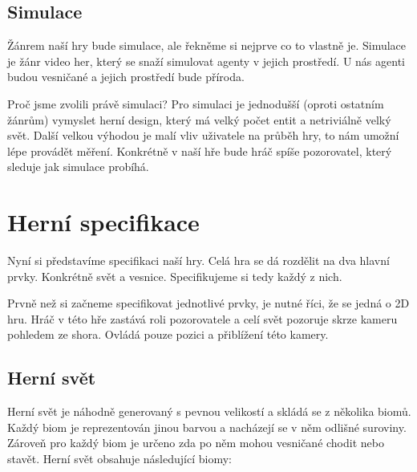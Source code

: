 
\subsection{Simulace}
Žánrem naší hry bude simulace, ale řekněme si nejprve co to vlastně je. Simulace je žánr video her, který se snaží simulovat agenty v jejich prostředí. U nás agenti budou vesničané a jejich prostředí bude příroda.

Proč jsme zvolili právě simulaci? Pro simulaci je jednodušší (oproti ostatním žánrům) vymyslet herní design, který má velký počet entit a netriviálně velký svět. Další velkou výhodou je malí vliv uživatele na průběh hry, to nám umožní lépe provádět měření. Konkrétně v naší hře bude hráč spíše pozorovatel, který sleduje jak simulace probíhá.


\section{Herní specifikace}
\label{sec:game-spec}
Nyní si představíme specifikaci naší hry. Celá hra se dá rozdělit na dva hlavní prvky. Konkrétně svět a vesnice. Specifikujeme si tedy každý z nich.

Prvně než si začneme specifikovat jednotlivé prvky, je nutné říci, že se jedná o 2D hru. Hráč v této hře zastává roli pozorovatele a celí svět pozoruje skrze kameru pohledem ze shora. Ovládá pouze pozici a přiblížení této kamery.

\subsection{Herní svět}
\label{sec:game-world}
Herní svět je náhodně generovaný s pevnou velikostí a skládá se z několika biomů. Každý biom je reprezentován jinou barvou a nacházejí se v něm odlišné suroviny. Zároveň pro každý biom je určeno zda po něm mohou vesničané chodit nebo stavět. Herní svět obsahuje následující biomy:

